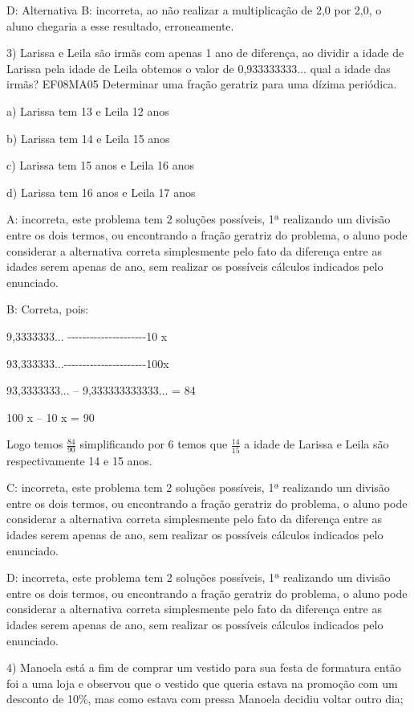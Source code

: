 D: Alternativa B: incorreta, ao não realizar a multiplicação de 2,0 por
2,0, o aluno chegaria a esse resultado, erroneamente.

3) Larissa e Leila são irmãs com apenas 1 ano de diferença, ao dividir a
idade de Larissa pela idade de Leila obtemos o valor de 0,933333333...
qual a idade das irmãs? EF08MA05 Determinar uma fração geratriz para uma
dízima periódica.

a) Larissa tem 13 e Leila 12 anos

b) Larissa tem 14 e Leila 15 anos

c) Larissa tem 15 anos e Leila 16 anos

d) Larissa tem 16 anos e Leila 17 anos

A: incorreta, este problema tem 2 soluções possíveis, 1ª realizando um
divisão entre os dois termos, ou encontrando a fração geratriz do
problema, o aluno pode considerar a alternativa correta simplesmente
pelo fato da diferença entre as idades serem apenas de ano, sem realizar
os possíveis cálculos indicados pelo enunciado.

B: Correta, pois:

9,3333333...
-\/-\/-\/-\/-\/-\/-\/-\/-\/-\/-\/-\/-\/-\/-\/-\/-\/-\/-\/-\/-10 x

93,333333...-\/-\/-\/-\/-\/-\/-\/-\/-\/-\/-\/-\/-\/-\/-\/-\/-\/-\/-\/-\/-\/-100x

93,3333333... -- 9,333333333333... = 84

100 x -- 10 x = 90

Logo temos \(\frac{84}{90}\) simplificando por 6 temos que
\(\frac{14}{15}\) a idade de Larissa e Leila são respectivamente 14 e 15
anos.

C: incorreta, este problema tem 2 soluções possíveis, 1ª realizando um
divisão entre os dois termos, ou encontrando a fração geratriz do
problema, o aluno pode considerar a alternativa correta simplesmente
pelo fato da diferença entre as idades serem apenas de ano, sem realizar
os possíveis cálculos indicados pelo enunciado.

D: incorreta, este problema tem 2 soluções possíveis, 1ª realizando um
divisão entre os dois termos, ou encontrando a fração geratriz do
problema, o aluno pode considerar a alternativa correta simplesmente
pelo fato da diferença entre as idades serem apenas de ano, sem realizar
os possíveis cálculos indicados pelo enunciado.

4) Manoela está a fim de comprar um vestido para sua festa de formatura
então foi a uma loja e observou que o vestido que queria estava na
promoção com um desconto de 10\%, mas como estava com pressa Manoela
decidiu voltar outro dia;


